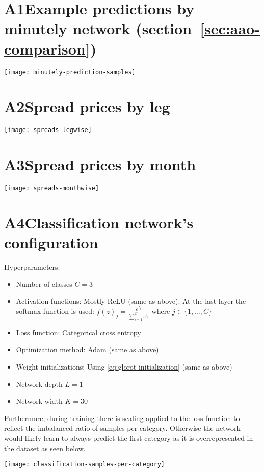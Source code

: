 \section*{A1\hspace{1em}Example predictions by minutely network (section~\ref{sec:aao-comparison})}

\texttt{[image: minutely-prediction-samples]}

\section*{A2\hspace{1em}Spread prices by leg}

\texttt{[image: spreads-legwise]}

\section*{A3\hspace{1em}Spread prices by month}

\texttt{[image: spreads-monthwise]}

\section*{A4\hspace{1em}Classification network's configuration}

Hyperparameters:

\begin{itemize}
	\item Number of classes $C=3$
	\item Activation functions: Mostly ReLU (same as above). At the last layer the softmax function is used: $f(z)_j = \frac{e^{z_j}}{\sum_{i=1}^C e^{z_i}}$ where $j \in \{1,\dots,C\}$
	\item Loss function: Categorical cross entropy
	\item Optimization method: Adam (same as above)
	\item Weight initializations: Using \eqref{eq:glorot-initialization} (same as above)
	\item Network depth $L = 1$
	\item Network width $K = 30$
\end{itemize}

Furthermore, during training there is scaling applied to the loss function to reflect the imbalanced ratio of samples per category. Otherwise the network would likely learn to always predict the first category as it is overrepresented in the dataset as seen below.

\vspace{1em}

\texttt{[image: classification-samples-per-category]}